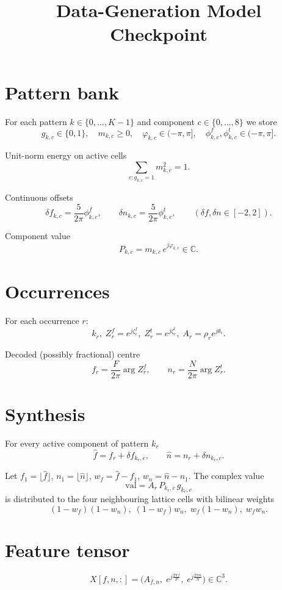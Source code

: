 \documentclass[11pt]{article}
\title{Data-Generation Model Checkpoint}
\date{}
\begin{document}
\maketitle

\section{Pattern bank}

For each pattern $k\in\{0,\dots, K-1\}$ and component
$c\in\{0,\dots,8\}$ we store
\[
g_{k,c}\in\{0,1\},\quad
m_{k,c}\ge0,\quad
\varphi_{k,c}\in(-\pi,\pi],\quad
\phi^{f}_{k,c},\phi^{t}_{k,c}\in(-\pi,\pi].
\]

\medskip
\noindent
Unit-norm energy on active cells
\[
\sum_{c:g_{k,c}=1} m_{k,c}^{2}=1.
\]

\medskip
\noindent
Continuous offsets
\[
\delta f_{k,c}= \frac{5}{2\pi}\phi^{f}_{k,c},
\qquad
\delta n_{k,c}= \frac{5}{2\pi}\phi^{t}_{k,c},
\qquad
(\delta f,\delta n\in[-2,2]).
\]

\noindent Component value
\[
P_{k,c}=m_{k,c}\,e^{j\varphi_{k,c}}\in\mathbb C .
\]

\section{Occurrences}

For each occurrence $r$:
\[
k_r,\;
Z^{f}_{r}=e^{j\zeta^{f}_r},\;
Z^{t}_{r}=e^{j\zeta^{t}_r},\;
A_r=\rho_r e^{j\theta_r}.
\]

Decoded (possibly fractional) centre
\[
f_r=\frac{F}{2\pi}\arg Z^{f}_{r},
\qquad
n_r=\frac{N}{2\pi}\arg Z^{t}_{r}.
\]

\section{Synthesis}

For every active component of pattern $k_r$
\[
\hat f=f_r+\delta f_{k_r,c},
\qquad
\hat n=n_r+\delta n_{k_r,c}.
\]

Let $f_1=\lfloor\hat f\rfloor$, $n_1=\lfloor\hat n\rfloor$,
$w_f=\hat f-f_1$, $w_n=\hat n-n_1$.
The complex value
\[
\text{val}=A_r\,P_{k_r,c}\,g_{k_r,c}
\]
is distributed to the four neighbouring lattice cells with bilinear
weights
\[
(1-w_f)(1-w_n),\;(1-w_f)w_n,\;w_f(1-w_n),\;w_f w_n.
\]

\section{Feature tensor}

\[
X[f,n,:]=
\bigl(
A_{f,n},\;
e^{j\frac{2\pi f}{F}},\;
e^{j\frac{2\pi n}{N}}
\bigr)\in\mathbb C^{3}.
\]
\end{document}
